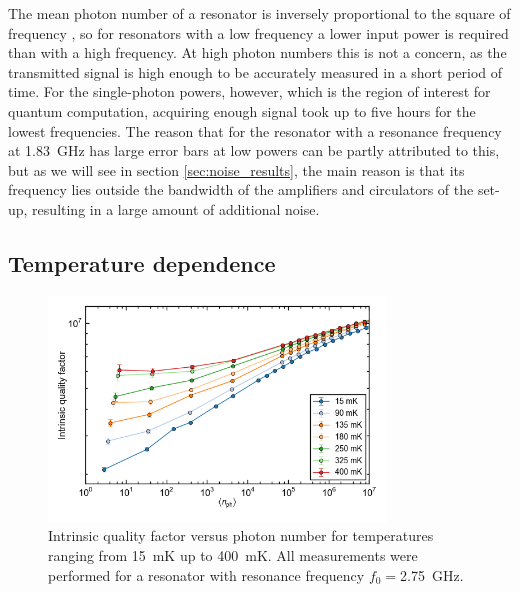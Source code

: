 \documentclass[12pt]{report}
\begin{document}
The mean photon number of a resonator is inversely proportional to the square of frequency \cite{DRIE}, so for resonators with a low frequency a lower input power is required than with a high frequency. At high photon numbers this is not a concern, as the transmitted signal is high enough to be accurately measured in a short period of time. For the single-photon powers, however, which is the region of interest for quantum computation, acquiring enough signal took up to five hours for the lowest frequencies. The reason that for the resonator with a resonance frequency at \SI{1.83}{\giga \hertz} has large error bars at low powers can be partly attributed to this, but as we will see in section \ref{sec:noise_results}, the main reason is that its frequency lies outside the bandwidth of the amplifiers and circulators of the set-up, resulting in a large amount of additional noise.





\subsection{Temperature dependence}
\label{sec:resonator:results:emperature_dependence}
\begin{figure}
    \centering
    \includegraphics[width=0.8\textwidth]{Figures/Qi_vs_n_photon_temperature_dependence.png}
    \caption{Intrinsic quality factor versus photon number for temperatures ranging from \SI{15}{\milli \kelvin} up to \SI{400}{\milli \kelvin}. All measurements were performed for a resonator with resonance frequency $f_0 = $\SI{2.75}{\giga \hertz}.}
    \label{fig:Qi_vs_n_photon_temperature_dependence}
\end{figure}
\end{document}
